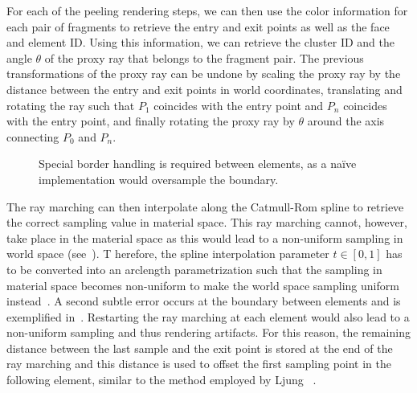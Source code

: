 For each of the peeling rendering steps, we can then use the color information for each pair of fragments to retrieve the entry and exit points as well as the face and element ID. Using this information, we can retrieve the cluster ID and the angle $\theta$ of the proxy ray that belongs to the fragment pair.  The previous transformations of the proxy ray can be undone by scaling the proxy ray by the distance between the entry and exit points in world coordinates, translating and rotating the ray such that $P_1$ coincides with the entry point and $P_n$ coincides with the entry point, and finally rotating the proxy ray by $\theta$ around the axis connecting $P_0$ and $P_n$.

\begin{figure}
\centering
{}
\caption{Special border handling is required between elements, as a na\"{i}ve implementation would oversample the boundary.}
\label{contributions:fem:overshoot}
\end{figure}


The ray marching can then interpolate along the Catmull-Rom spline to retrieve the correct sampling value in material space.  This ray marching cannot, however, take place in the material space as this would lead to a non-uniform sampling in world space (see~). T herefore, the spline interpolation parameter $t \in [0,1]$ has to be converted into an arclength parametrization such that the sampling in material space becomes non-uniform to make the world space sampling uniform instead~\cite{guenter90arclength}.  A second subtle error occurs at the boundary between elements and is exemplified in~.  Restarting the ray marching at each element would also lead to a non-uniform sampling and thus rendering artifacts.  For this reason, the remaining distance between the last sample and the exit point is stored at the end of the ray marching and this distance is used to offset the first sampling point in the following element, similar to the method employed by Ljung \etal~\cite{ljung2006adaptive}.

